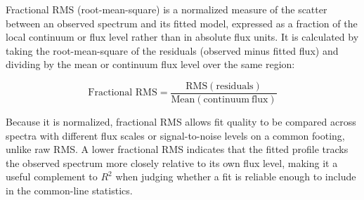 \documentclass[12pt]{article}
\begin{document}
Fractional RMS (root-mean-square) is a normalized measure of the scatter between an observed spectrum and its fitted model, expressed as a fraction of the local continuum or flux level rather than in absolute flux units. It is calculated by taking the root-mean-square of the residuals (observed minus fitted flux) and dividing by the mean or continuum flux level over the same region:

\begin{equation}
  \text{Fractional RMS} = \frac{\mathrm{RMS(residuals)}}{\mathrm{Mean(continuum\ flux)}}
  \label{eq:fractional-rms}
\end{equation}

Because it is normalized, fractional RMS allows fit quality to be compared across spectra with different flux scales or signal-to-noise levels on a common footing, unlike raw RMS. A lower fractional RMS indicates that the fitted profile tracks the observed spectrum more closely relative to its own flux level, making it a useful complement to $R^2$ when judging whether a fit is reliable enough to include in the common-line statistics.
\end{document}
